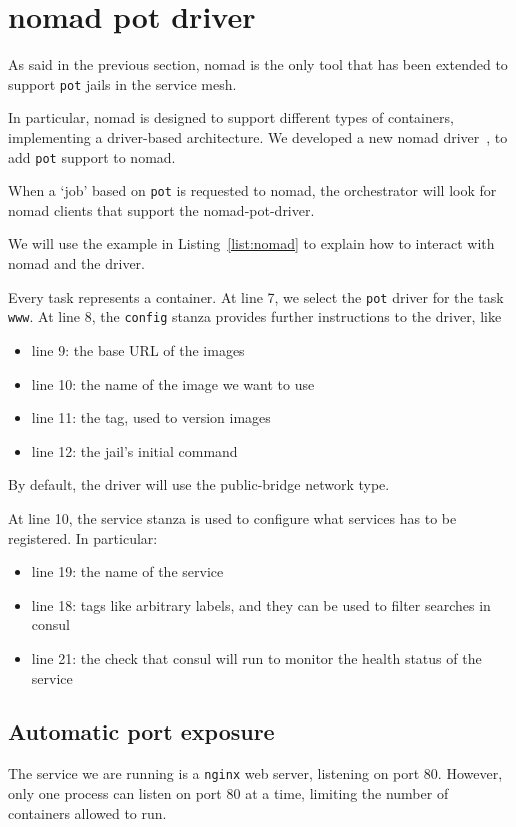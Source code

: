 \documentclass[conference,a4paper,11pt]{IEEEtran}
\begin{document}
\section{nomad pot driver}\label{sec:nomad-pot-driver}
As said in the previous section, nomad is the only tool that has been extended to support \texttt{pot} jails in the service mesh.

In particular, nomad is designed to support different types of containers, implementing a driver-based architecture. We developed a new nomad driver~\cite{nomad-pot-driver}, to add \texttt{pot} support to nomad.

When a `job' based on \texttt{pot} is requested to nomad, the orchestrator will look for nomad clients that support the nomad-pot-driver.

We will use the example in Listing~\ref{list:nomad} to explain how to interact with nomad and the driver.

Every task represents a container. At line 7, we select the \texttt{pot} driver for the task \texttt{www}. At line 8, the \texttt{config} stanza provides further instructions to the driver, like
\begin{itemize}
	\item line 9: the base URL of the images
	\item line 10: the name of the image we want to use
	\item line 11: the tag, used to version images
	\item line 12: the jail's initial command
\end{itemize}
By default, the driver will use the public-bridge network type.

At line 10, the service stanza is used to configure what services has to be registered. In particular:
\begin{itemize}
	\item line 19: the name of the service
	\item line 18: tags like arbitrary labels, and they can be used to filter searches in consul
	\item line 21: the check that consul will run to monitor the health status of the service
\end{itemize}

\subsection{Automatic port exposure}
The service we are running is a \texttt{nginx} web server, listening on port 80. However, only one process can listen on port 80 at a time, limiting the number of containers allowed to run.
\end{document}
